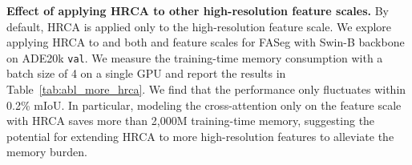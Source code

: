 \begin{table}[tb!]
\centering
\caption{Effect of applying HRCA to other high-resolution feature scales for FASeg with Swin-B Backbone on ADE20K \texttt{val}~\cite{zhou2017scene} with 150 categories.}
\vspace{-0.5em}
\label{tab:abl_more_hrca}
\vspace{-2em}
\end{table}

\noindent\textbf{Effect of applying HRCA to other high-resolution feature scales.} By default, HRCA is applied only to the high-resolution  feature scale. We explore applying HRCA to  and both  and  feature scales for FASeg with Swin-B backbone on ADE20k \texttt{val}. We measure the training-time memory consumption with a batch size of 4 on
a single GPU and report the results in Table~\ref{tab:abl_more_hrca}. We find that the performance only fluctuates within 0.2\% mIoU. In particular, modeling the cross-attention only on the  feature scale with HRCA saves more than 2,000M training-time memory, suggesting the potential for extending HRCA to more high-resolution features to alleviate the memory burden.